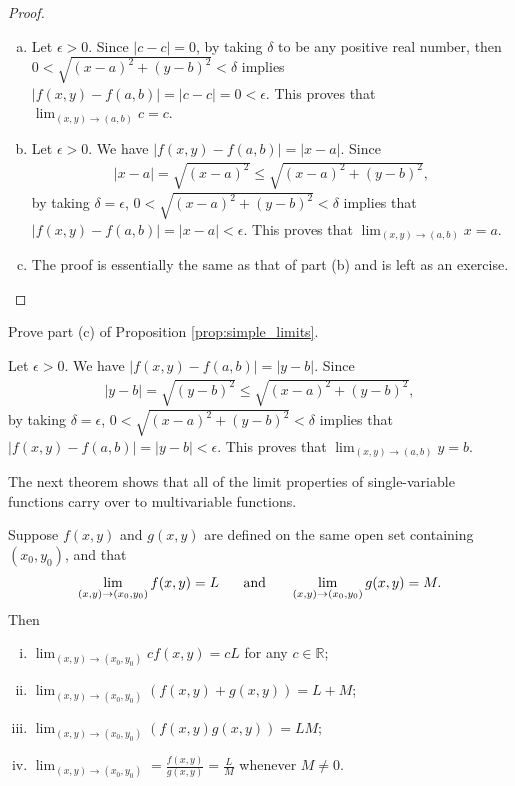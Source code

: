 \documentclass[12pt,letterpaper,reqno]{article}
\numberwithin{equation}{section}
\newcommand{\R}{\ensuremath{\mathbb R}}
\begin{document}
{\begin{proof}\hspace{15cm}
	\begin{enumerate}[(a)]
		\item Let $\epsilon>0$. Since $|c-c|=0$, by taking $\delta$ to be any positive real number, then \newline $0<\sqrt{(x-a)^2+(y-b)^2}<\delta$ implies $|f(x,y)-f(a,b)|=|c-c|=0<\epsilon$. This proves that $\lim_{(x,y) \to (a,b)} c=c$.
		\item Let $\epsilon>0$. We have $|f(x,y)-f(a,b)|=|x-a|$. Since 
		\begin{align*}
			|x-a|=\sqrt{(x-a)^2} \leq \sqrt{(x-a)^2+(y-b)^2},
		\end{align*}
		by taking $\delta=\epsilon$, $0<\sqrt{(x-a)^2+(y-b)^2}<\delta$ implies that $|f(x,y)-f(a,b)|=|x-a|<\epsilon$. This proves that $\lim_{(x,y) \to (a,b)} x = a$.
		\item The proof is essentially the same as that of part (b) and is left as an exercise.
	\end{enumerate}
\end{proof}

\begin{exercise}
Prove part (c) of Proposition \ref{prop:simple_limits}. 	
\end{exercise}

{\color{red}
\begin{solution}
	Let $\epsilon>0$. We have $|f(x,y)-f(a,b)|=|y-b|$. Since 
		\begin{align*}
			|y-b|=\sqrt{(y-b)^2} \leq \sqrt{(x-a)^2+(y-b)^2},
		\end{align*}
		by taking $\delta=\epsilon$, $0<\sqrt{(x-a)^2+(y-b)^2}<\delta$ implies that $|f(x,y)-f(a,b)|=|y-b|<\epsilon$. This proves that $\lim_{(x,y) \to (a,b)} y = b$.
\end{solution}}

The next theorem shows that all of the limit properties of single-variable functions carry over to multivariable functions.

\begin{thm}\label{thm:limit_laws_for_multivariable_functions}
Suppose $f(x,y)$ and $g(x,y)$ are defined on the same open set containing $(x_0,y_0)$, and that 
\begin{align*}
	\lim_{(x,y) \to (x_0,y_0)}f(x,y)=L \hspace{0.5cm} \text{ and } \hspace{0.5cm} \lim_{(x,y) \to (x_0,y_0)}g(x,y)=M.
\end{align*}
Then
	\begin{enumerate}[(i)]
		\item $\lim_{(x,y) \to (x_0,y_0)} cf(x,y)=cL$ for any $c \in \R$;
		\item $\lim_{(x,y) \to (x_0,y_0)}(f(x,y)+ g(x,y))=L+M$;
		\item $\lim_{(x,y) \to (x_0,y_0)}(f(x,y)g(x,y))=LM$;
		\item $\lim_{(x,y) \to (x_0,y_0)}=\frac{f(x,y)}{g(x,y)}=\frac{L}{M}$ whenever $M \neq 0$.
	\end{enumerate}
\end{thm}

}
\end{document}
